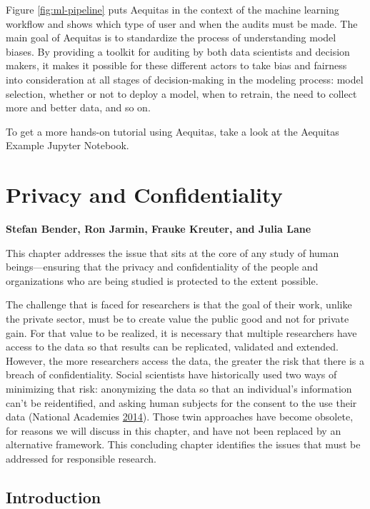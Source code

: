 \documentclass[]{krantz}
\begin{document}
Figure \ref{fig:ml-pipeline} puts Aequitas in the context of the machine
learning workflow and shows which type of user and when the audits must
be made. The main goal of Aequitas is to standardize the process of
understanding model biases. By providing a toolkit for auditing by both
data scientists and decision makers, it makes it possible for these
different actors to take bias and fairness into consideration at all
stages of decision-making in the modeling process: model selection,
whether or not to deploy a model, when to retrain, the need to collect
more and better data, and so on.

To get a more hands-on tutorial using Aequitas, take a look at the
Aequitas Example Jupyter Notebook.

\hypertarget{chap:privacy}{\chapter{Privacy and
Confidentiality}\label{chap:privacy}}

\textbf{Stefan Bender, Ron Jarmin, Frauke Kreuter, and Julia Lane}

This chapter addresses the issue that sits at the core of any study of
human beings---ensuring that the privacy and confidentiality of the
people and organizations who are being studied is protected to the
extent possible.

The challenge that is faced for researchers is that the goal of their
work, unlike the private sector, must be to create value the public good
and not for private gain. For that value to be realized, it is necessary
that multiple researchers have access to the data so that results can be
replicated, validated and extended. However, the more researchers access
the data, the greater the risk that there is a breach of
confidentiality. Social scientists have historically used two ways of
minimizing that risk: anonymizing the data so that an individual's
information can't be reidentified, and asking human subjects for the
consent to the use their data (National Academies
\protect\hyperlink{ref-NationalAcademies2014}{2014}). Those twin
approaches have become obsolete, for reasons we will discuss in this
chapter, and have not been replaced by an alternative framework. This
concluding chapter identifies the issues that must be addressed for
responsible research.

\section{Introduction}\label{introduction-5}
\end{document}
